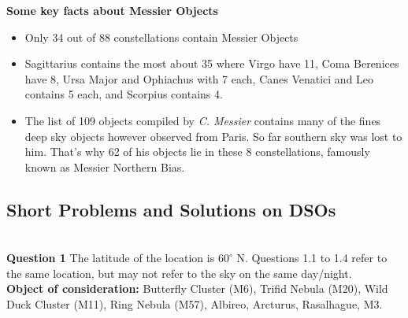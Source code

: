 \documentclass[a4paper,12pt]{extarticle}
\begin{document}
\textbf{Some key facts about Messier Objects}
\begin{itemize}
    \item Only 34 out of 88 constellations contain Messier Objects
    \item Sagittarius contains the most about 35 where Virgo have 11, Coma Berenices have 8, Ursa Major and Ophiachus with 7 each, Canes Venatici and Leo contains 5 each, and Scorpius contains 4.
    \item The list of 109 objects compiled by \textit{C. Messier} contains many of the fines deep sky objects however observed from Paris. So far southern sky was lost to him. That's why 62 of his objects lie in these 8 constellations, famously known as Messier Northern Bias. 
\end{itemize}

\clearpage 
\subsection{Short Problems and Solutions on DSOs}

\\


\textsf{\textbf{Question 1}} The latitude of the location is $60^\circ$ N. Questions 1.1 to 1.4 refer to the same location, but may not refer to the sky on the same day/night. \\

\textbf{Object of consideration:} Butterfly Cluster (M6), Trifid Nebula (M20), Wild Duck Cluster (M11), Ring Nebula (M57), Albireo, Arcturus, Rasalhague, M3.
\end{document}

